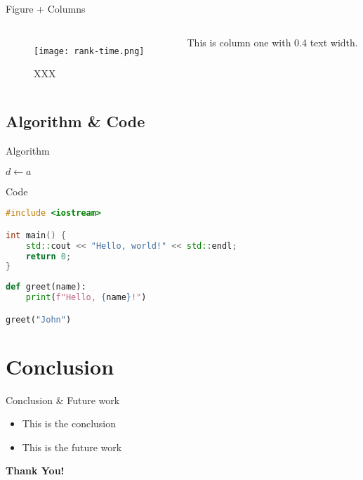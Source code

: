 \documentclass[compress,aspectratio=43]{beamer}
\begin{document}
\begin{frame}{Figure + Columns}
    \begin{columns}
        \begin{figure}
            \texttt{[image: rank-time.png]}
            \caption{XXX}
        \end{figure}
        This is column one with 0.4 text width.
    \end{columns}
\end{frame}

\subsection{Algorithm \& Code}

\begin{frame}{Algorithm}
    \begin{algorithm}[H]
        \caption{Euclid's algorithm}
        $d \leftarrow a$\;
    \end{algorithm}

\end{frame}

\begin{frame}[fragile]{Code}

    \begin{lstlisting}[language=c++]
#include <iostream>

int main() {
    std::cout << "Hello, world!" << std::endl;
    return 0;
}
\end{lstlisting}
    \begin{lstlisting}[language=python]
def greet(name):
    print(f"Hello, {name}!")

greet("John")
\end{lstlisting}

\end{frame}


\section{Conclusion}

\begin{frame}{Conclusion \& Future work}
    \begin{itemize}
        \item This is the conclusion
              \medskip
        \item This is the future work
    \end{itemize}
\end{frame}

\begin{frame}[plain]
    \vspace{0.3\textheight}
    \Huge{\centerline{\color{simplebeamercolor}\textbf{Thank You!}}}
\end{frame}
\end{document}
